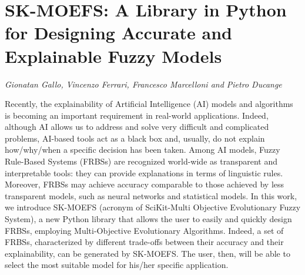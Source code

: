 \documentclass[../booklet.tex]{subfiles}
\begin{document}
\section[SK-MOEFS: A Library in Python for Designing Accurate and Explainable Fuzzy Models. {\it Gionatan Gallo, Vincenzo Ferrari, Francesco Marcelloni and Pietro Ducange}]{SK-MOEFS: A Library in Python for Designing Accurate and Explainable Fuzzy Models}
   

\begin{center}
  {\it Gionatan Gallo, Vincenzo Ferrari, Francesco Marcelloni and Pietro Ducange}
\end{center}

\vskip 0.8cm


Recently, the explainability of Artificial Intelligence (AI) models and algorithms is becoming an important requirement in real-world applications. Indeed, although AI allows us to address and solve very difficult and complicated problems, AI-based tools act as a black box and, usually, do not explain how/why/when a specific decision has been taken. Among AI models, Fuzzy Rule-Based Systems (FRBSs) are recognized world-wide as transparent and interpretable tools: they can provide explanations in terms of linguistic rules. Moreover, FRBSs may achieve accuracy comparable to those achieved by less transparent models, such as neural networks and statistical models. In this work, we introduce SK-MOEFS (acronym of SciKit-Multi Objective Evolutionary Fuzzy System), a new Python library that allows the user to easily and quickly design FRBSs, employing Multi-Objective Evolutionary Algorithms. Indeed, a set of FRBSs, characterized by different trade-offs between their accuracy and their explainability, can be generated by SK-MOEFS. The user, then, will be able to select the most suitable model for his/her specific application.

\end{document}
